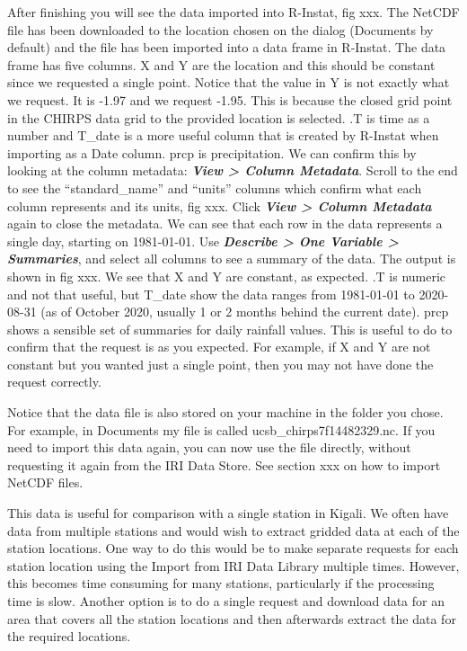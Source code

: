 \documentclass[
  letterpaper,
  DIV=11,
  numbers=noendperiod]{scrreprt}
\begin{document}
After finishing you will see the data imported into R-Instat, fig xxx.
The NetCDF file has been downloaded to the location chosen on the dialog
(Documents by default) and the file has been imported into a data frame
in R-Instat. The data frame has five columns. X and Y are the location
and this should be constant since we requested a single point. Notice
that the value in Y is not exactly what we request. It is -1.97 and we
request -1.95. This is because the closed grid point in the CHIRPS data
grid to the provided location is selected. .T is time as a number and
T\_date is a more useful column that is created by R-Instat when
importing as a Date column. prcp is precipitation. We can confirm this
by looking at the column metadata: \textbf{\emph{View \textgreater{}
Column Metadata}}. Scroll to the end to see the ``standard\_name'' and
``units'' columns which confirm what each column represents and its
units, fig xxx. Click \textbf{\emph{View \textgreater{} Column
Metadata}} again to close the metadata. We can see that each row in the
data represents a single day, starting on 1981-01-01. Use
\textbf{\emph{Describe \textgreater{} One Variable \textgreater{}
Summaries}}, and select all columns to see a summary of the data. The
output is shown in fig xxx. We see that X and Y are constant, as
expected. .T is numeric and not that useful, but T\_date show the data
ranges from 1981-01-01 to 2020-08-31 (as of October 2020, usually 1 or 2
months behind the current date). prcp shows a sensible set of summaries
for daily rainfall values. This is useful to do to confirm that the
request is as you expected. For example, if X and Y are not constant but
you wanted just a single point, then you may not have done the request
correctly.

Notice that the data file is also stored on your machine in the folder
you chose. For example, in Documents my file is called
ucsb\_chirps7f14482329.nc. If you need to import this data again, you
can now use the file directly, without requesting it again from the IRI
Data Store. See section xxx on how to import NetCDF files.

This data is useful for comparison with a single station in Kigali. We
often have data from multiple stations and would wish to extract gridded
data at each of the station locations. One way to do this would be to
make separate requests for each station location using the Import from
IRI Data Library multiple times. However, this becomes time consuming
for many stations, particularly if the processing time is slow. Another
option is to do a single request and download data for an area that
covers all the station locations and then afterwards extract the data
for the required locations.
\end{document}
